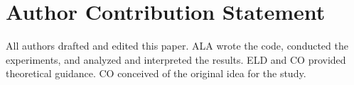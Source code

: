 \section*{Author Contribution Statement}

All authors drafted and edited this paper. ALA wrote the code, conducted the experiments, and analyzed and interpreted the results. ELD and CO provided theoretical guidance. CO conceived of the original idea for the study.